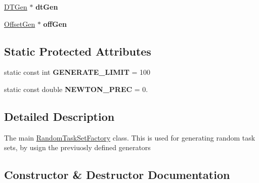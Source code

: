 \begin{DoxyCompactItemize}
\item 
\hyperlink{classRTSim_1_1DTGen}{D\+T\+Gen} $\ast$ {\bfseries dt\+Gen}\hypertarget{classRTSim_1_1RandomTaskSetFactory_a7cc03b1e163bf0c1a4d7d176008003f4}{}\label{classRTSim_1_1RandomTaskSetFactory_a7cc03b1e163bf0c1a4d7d176008003f4}

\item 
\hyperlink{classRTSim_1_1OffsetGen}{Offset\+Gen} $\ast$ {\bfseries off\+Gen}\hypertarget{classRTSim_1_1RandomTaskSetFactory_aa5f6721d15acee5fbe33c35867823337}{}\label{classRTSim_1_1RandomTaskSetFactory_aa5f6721d15acee5fbe33c35867823337}

\end{DoxyCompactItemize}
\subsection*{Static Protected Attributes}
\begin{DoxyCompactItemize}
\item 
static const int {\bfseries G\+E\+N\+E\+R\+A\+T\+E\+\_\+\+L\+I\+M\+IT} = 100\hypertarget{classRTSim_1_1RandomTaskSetFactory_a4339f729f94033e36cf37c48a5342f4e}{}\label{classRTSim_1_1RandomTaskSetFactory_a4339f729f94033e36cf37c48a5342f4e}

\item 
static const double {\bfseries N\+E\+W\+T\+O\+N\+\_\+\+P\+R\+EC} = 0.\hypertarget{classRTSim_1_1RandomTaskSetFactory_a326f3a16c0cca6579d0816aebab6a4b9}{}\label{classRTSim_1_1RandomTaskSetFactory_a326f3a16c0cca6579d0816aebab6a4b9}

\end{DoxyCompactItemize}


\subsection{Detailed Description}
The main \hyperlink{classRTSim_1_1RandomTaskSetFactory}{Random\+Task\+Set\+Factory} class. This is used for generating random task sets, by usign the previuosly defined generators 

\subsection{Constructor \& Destructor Documentation}
